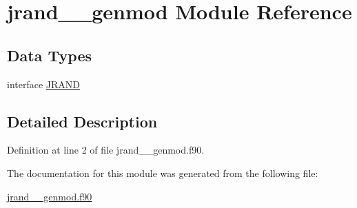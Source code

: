 \hypertarget{classjrand____genmod}{\section{jrand\+\_\+\+\_\+genmod Module Reference}
\label{classjrand____genmod}
}
\subsection*{Data Types}
\begin{DoxyCompactItemize}
\item 
interface \hyperlink{interfacejrand____genmod_1_1JRAND}{J\+R\+A\+N\+D}
\end{DoxyCompactItemize}


\subsection{Detailed Description}


Definition at line 2 of file jrand\+\_\+\+\_\+genmod.\+f90.



The documentation for this module was generated from the following file\+:\begin{DoxyCompactItemize}
\item 
\hyperlink{jrand____genmod_8f90}{jrand\+\_\+\+\_\+genmod.\+f90}\end{DoxyCompactItemize}
